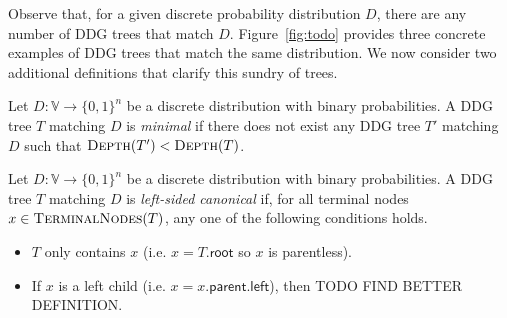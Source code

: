 Observe that, for a given discrete probability distribution $D$, there are any number of DDG trees that match $D$.
Figure~\ref{fig:todo} provides three concrete examples of DDG trees that match the same distribution.
We now consider two additional definitions that clarify this sundry of trees.

\begin{definition}
Let $D:\mathbb{V} \to \{0, 1\}^n$ be a discrete distribution with binary probabilities. A DDG tree $T$ matching $D$ is \emph{minimal} if there does not exist any DDG tree $T'$ matching $D$ such that $\textsc{Depth}(T') < \textsc{Depth}(T)$.
\end{definition}

\begin{definition}
Let $D:\mathbb{V} \to \{0, 1\}^n$ be a discrete distribution with binary probabilities. A DDG tree $T$ matching $D$ is \emph{left-sided canonical} if, for all terminal nodes $x \in \textsc{TerminalNodes}(T)$, any one of the following conditions holds.
\begin{itemize}
	\item $T$ only contains $x$ (i.e. $x = T.\mathsf{root}$ so $x$ is parentless).
	\item If $x$ is a left child (i.e. $x = x.\mathsf{parent}.\mathsf{left}$), then TODO FIND BETTER DEFINITION.
\end{itemize}
\end{definition}

